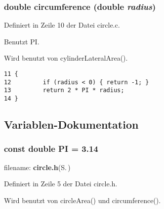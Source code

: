 \subsubsection{\setlength{\rightskip}{0pt plus 5cm}double circumference (double {\em radius})}\label{circle_8h_e48234f11885e6a380e29e50f272c7b4}




Definiert in Zeile 10 der Datei circle.c.

Benutzt PI.

Wird benutzt von cylinder\-Lateral\-Area().

\footnotesize\begin{verbatim}11 {
12         if (radius < 0) { return -1; }
13         return 2 * PI * radius;
14 }
\end{verbatim}\normalsize 




\subsection{Variablen-Dokumentation}
\subsubsection{\setlength{\rightskip}{0pt plus 5cm}const double {\bf PI} = 3.14\hspace{0.3cm}{\tt  [static]}}\label{circle_8h_3a372b04b95323b72c2b2f9a5d24e67b}


filename: {\bf circle.h}{\rm (S.\,\pageref{circle_8h})} 

Definiert in Zeile 5 der Datei circle.h.

Wird benutzt von circle\-Area() und circumference().